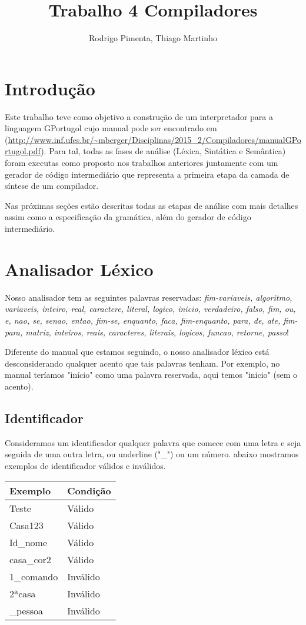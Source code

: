\documentclass[
12pt,				%
a4paper,			%
english,			%
french,				%
spanish,			%
brazil,				%
article
]{abntex2}
\title{Trabalho 4 Compiladores}
\author{Rodrigo Pimenta, Thiago Martinho}
\begin{document}
\maketitle

\section{Introdução}

Este trabalho teve como objetivo a construção de um interpretador para a linguagem GPortugol cujo manual pode ser encontrado em (\url{http://www.inf.ufes.br/~mberger/Disciplinas/2015_2/Compiladores/manualGPortugol.pdf}). Para tal, todas as fases de análise (Léxica, Sintática e Semântica) foram executas como proposto nos trabalhos anteriores juntamente com um gerador de código intermediário que representa a primeira etapa da camada de síntese de um compilador.

Nas próximas seções estão descritas todas as etapas de análise com mais detalhes assim como a especificação da gramática, além do gerador de código intermediário.

\section{Analisador Léxico}
Nosso analisador tem as seguintes palavras reservadas:
\textit{fim-variaveis, algoritmo, variaveis, inteiro, real, caractere, literal, logico, inicio, verdadeiro, falso, fim, ou, e, nao, se, senao, entao, fim-se, enquanto, faca, fim-enquanto, para, de, ate, fim-para, matriz, inteiros, reais, caracteres, literais, logicos, funcao, retorne, passo}!

Diferente do manual que estamos seguindo, o nosso analisador léxico está desconsiderando qualquer acento que tais palavras tenham. Por exemplo, no manual teríamos "início" como uma palavra reservada, aqui temos "inicio" (sem o acento).

\subsection{Identificador}
Consideramos um identificador qualquer palavra que comece com uma letra e seja seguida de uma outra letra, ou underline ("\_") ou um número. abaixo mostramos exemplos de identificador válidos e inválidos.

\begin{center}
	\begin{tabular}{ll}
		\hline Exemplo & Condição  \\
		\hline Teste & Válido \\
		\hline Casa123 & Válido \\
		\hline Id\_nome & Válido \\
		\hline casa\_cor2 & Válido \\
		\hline 1\_comando & Inválido \\
		\hline 2ªcasa & Inválido \\
		\hline \_pessoa & Inválido \\
		\hline
	\end{tabular}
	\label{tab:}
\end{center}
\end{document}
